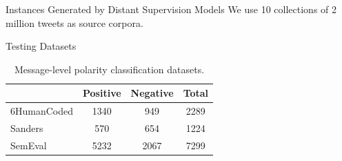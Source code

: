 \documentclass[handout]{beamer}
\begin{document}
\begin{frame}{Instances Generated by Distant Supervision Models}
We use 10 collections of 2 million tweets as source corpora.
\begin{table}
\begin{center}
\end{center}
\end{table} 



\end{frame}


\begin{frame}{Testing Datasets}

 \begin{table}
\begin{center}
\begin{tabular}{l|c|c|c}
\hline
 & Positive & Negative & Total \\ \hline
6HumanCoded & 1340 & 949 & 2289 \\ 
Sanders & 570 & 654 & 1224 \\ 
SemEval & 5232 & 2067 & 7299 \\ \hline
\end{tabular}
\end{center}
\caption{Message-level polarity classification datasets.}
\label{tab:polcorpus}
\end{table} 


\end{frame}
\end{document}
